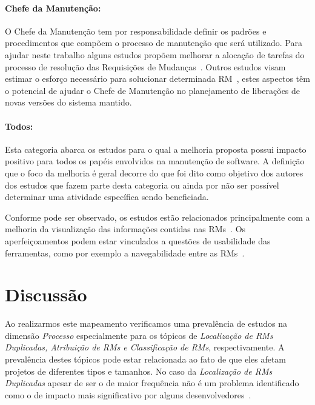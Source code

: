 \paragraph{Chefe da Manutenção:}

O Chefe da Manutenção tem por responsabilidade definir os padrões e
procedimentos que compõem o processo de manutenção que será utilizado. Para
ajudar neste trabalho alguns estudos propõem melhorar a alocação de tarefas do
processo de resolução das Requisições de Mudanças~\cite{netto2010automated}.
Outros estudos visam estimar o esforço necessário para solucionar determinada
RM~\cite{Vijayakumar2014, Nagwani2010}, estes aspectos têm o potencial de ajudar
o Chefe de Manutenção no planejamento de liberações de novas versões do sistema
mantido.

\paragraph{Todos:}

Esta categoria abarca os estudos para o qual a melhoria proposta possui impacto
positivo para todos os papéis envolvidos na manutenção de software. A definição
que o foco da melhoria é geral decorre do que foi dito como objetivo dos autores
dos estudos que fazem parte desta categoria ou ainda por não ser possível
determinar uma atividade específica sendo beneficiada.

Conforme pode ser observado, os estudos estão relacionados principalmente com a
melhoria da  visualização das informações contidas nas RMs~\cite{hora2012bug,
	takama2013application, dal2014bug}. Os aperfeiçoamentos podem estar
vinculados a questões de usabilidade das ferramentas, como por exemplo a
navegabilidade entre as RMs~\cite{dal2014bug}.

\section{Discussão}
\label{sec:discussao}

Ao realizarmos este mapeamento verificamos uma prevalência de estudos na
dimensão \textit{Processo} especialmente para os tópicos de \textit{Localização
    de RMs Duplicadas, Atribuição de RMs e Classificação de RMs},
respectivamente. A prevalência destes tópicos pode estar relacionada ao fato de
que eles afetam projetos de diferentes tipos e tamanhos. No caso da
\textit{Localização de RMs Duplicadas} apesar de ser o de maior frequência não é
um problema identificado como o de impacto mais significativo por alguns
desenvolvedores~\cite{zimmermann2010makes}.

